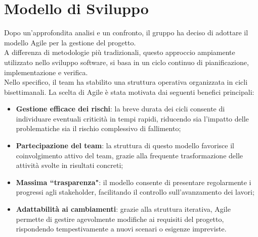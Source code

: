 \section{Modello di Sviluppo}
Dopo un'approfondita analisi e un confronto, il gruppo ha deciso di adottare il modello Agile per la gestione del progetto.\\
A differenza di metodologie più tradizionali, questo approccio ampiamente utilizzato nello sviluppo software, si basa in un ciclo continuo di pianificazione, implementazione e verifica.\\
Nello specifico, il team ha stabilito una struttura operativa organizzata in cicli bisettimanali. La scelta di Agile è stata motivata dai seguenti benefici principali: 
\begin{itemize}[topsep=1pt, itemsep=1pt]
    \item \textbf{Gestione efficace dei rischi}: la breve durata dei cicli consente di individuare eventuali criticità in tempi rapidi, riducendo sia l’impatto delle problematiche sia il rischio complessivo di fallimento;
    \item \textbf{Partecipazione del team}: la struttura di questo modello favorisce il coinvolgimento attivo del team, grazie alla frequente trasformazione delle attività svolte in risultati concreti;
    \item \textbf{Massima ``trasparenza"}: il modello consente di presentare regolarmente i progressi agli stakeholder, facilitando il controllo sull'avanzamento dei lavori;
    \item \textbf{Adattabilità ai cambiamenti}: grazie alla struttura iterativa, Agile permette di gestire agevolmente modifiche ai requisiti del progetto, rispondendo tempestivamente a nuovi scenari o esigenze impreviste.
\end{itemize}